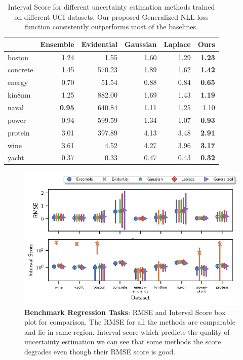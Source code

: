 \documentclass[letterpaper, 10 pt, conference]{ieeeconf}  %
\begin{document}
\begin{table}[t]
\centering
\begin{tabular}{l|r|r|r|r|r}
 & Ensemble & Evidential & Gaussian & Laplace & Ours \\
 \hline
boston & 1.24 & 1.55 & 1.60 & 1.29 & \textbf{1.23} \\
concrete & 1.45 & 570.23 & 1.89 & 1.62 & \textbf{1.42} \\
energy & 0.70 & 51.54 & 0.88 & 0.84 & \textbf{0.65} \\
kin8nm & 1.25 & 882.00 & 1.69 & 1.43 & \textbf{1.19} \\
naval & \textbf{0.95} & 640.84 & 1.11 & 1.25 & 1.10 \\
power & 0.94 & 599.59 & 1.34 & 1.07 & \textbf{0.93} \\
protein & 3.01 & 397.89 & 4.13 & 3.48 & \textbf{2.91} \\
wine & 3.61 & 4.52 & 4.27 & 3.96 & \textbf{3.17} \\
yacht & 0.37 & 0.33 & 0.47 & 0.43 & \textbf{0.32} \\
 \hline

\end{tabular}
\caption{Interval Score for different uncertainty estimation methods trained on different UCI datasets. Our proposed Generalized NLL loss function consistently outperforms most of the  baselines. }
\label{tab:ISTable}
\end{table}

\begin{figure}[t]
	\includegraphics[width=\linewidth]{fig/RMSE_IS_Comb_point_uci.png}	
	\caption{\textbf{Benchmark Regression Tasks}: RMSE and Interval Score box plot for comparison. The RMSE for all the methods are comparable and lie in same region. Interval score which predicts the quality of uncertainty estimation we can see that some methods the score degrades even though their RMSE score is good.
		\label{fig:benchmarkRegression}
	}
\end{figure}
\end{document}
